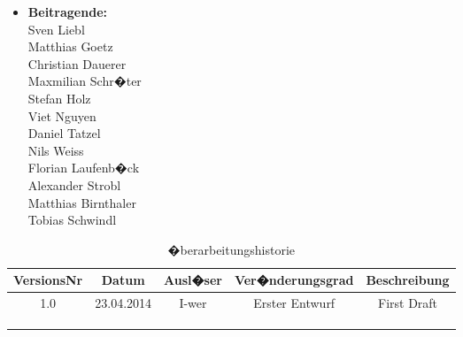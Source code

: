 \documentclass[10pt,a4paper]{scrartcl}
\begin{document}
\begin{center}
\end{center}


\newpage
\begin{itemize}
\item[] \textbf{\large Beitragende:}\\
Sven Liebl\\
Matthias Goetz\\
Christian Dauerer\\
Maxmilian Schr�ter\\
Stefan Holz\\
Viet Nguyen\\
Daniel Tatzel\\
Nils Weiss\\
Florian Laufenb�ck\\
Alexander Strobl\\
Matthias Birnthaler\\
Tobias Schwindl
\end{itemize}

\bigskip

\begin{table}[!h]
 	\centering
	\begin{tabular}{|c|c|c|c||c|} 
	\hline
	\textbf{VersionsNr} &  \textbf{Datum} & \textbf{Ausl�ser} & \textbf{Ver�nderungsgrad} & \textbf{Beschreibung} \\
	\hline
	1.0 & 23.04.2014 & I-wer & Erster Entwurf & First Draft \\
	\hline
	\text{ } & \text{ } & \text{ } & \text{ } & \text{ } \\
	\hline
	\text{ } & \text{ } & \text{ } & \text{ } & \text{ } \\
	\hline
	\text{ } & \text{ } & \text{ } & \text{ } & \text{ } \\
	\hline
	\end{tabular}

\caption{�berarbeitungshistorie}
\end{table}
\end{document}
